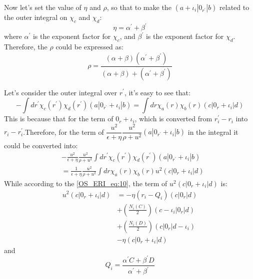 Now let's set the value of $\eta$ and $\rho$, so that to make the $(a+\iota_{i}|0_{r^{'}}|b)$
related to the outer integral on $\chi_{c}$ and $\chi_{d}$:
\begin{equation}
 \label{OS_ERI_eq:16}
\eta = \alpha^{'} + \beta^{'} 
\end{equation}
where $\alpha^{'}$ is the exponent factor for $\chi_{c}$, and $\beta^{'}$ is the exponent
factor for $\chi_{d}$. Therefore, the $\rho$ could be expressed as:
\begin{equation}
 \label{OS_ERI_eq:17}
\rho = \frac{(\alpha+\beta)(\alpha^{'} + \beta^{'})}{(\alpha+\beta)+(\alpha^{'} + \beta^{'})} 
\end{equation}

Let's consider the outer integral over $r^{'}$, it's easy to see that:
\begin{equation}
\label{OS_ERI_eq:18}
 -\int dr^{'} \chi_{c}(r^{'})\chi_{d}(r^{'})(a|0_{r^{'}} +\iota_{i} |b)
= \int dr \chi_{a}(r)\chi_{b}(r)(c|0_{r} + \iota_{i}|d)
\end{equation}
This is because that for the term of $0_{r} + \iota_{i}$, which is converted from
$r^{'}_{i} - r_{i}$ into $r_{i}-r^{'}_{i}$.Therefore, for the term of 
$\dfrac{u^{2}}{\epsilon+\eta}\dfrac{u^{2}}
{\rho+u^{2}}(a|0_{r^{'}}+\iota_{i}|b)$ in the integral it could be converted into:
\begin{equation}
 \label{OS_ERI_eq:19}
\begin{split}
&-\frac{u^{2}}{\epsilon+\eta}\frac{u^{2}}
{\rho+u^{2}}\int dr^{'} \chi_{c}(r^{'})\chi_{d}(r^{'})(a|0_{r^{'}}+\iota_{i}|b) \\
&=\frac{1}{\epsilon+\eta}\frac{u^{2}}
{\rho+u^{2}}\int dr \chi_{a}(r)\chi_{b}(r)u^{2}(c|0_{r}+\iota_{i}|d)
\end{split}
\end{equation}
While according to the \ref{OS_ERI_eq:10}, the term of $u^{2}(c|0_{r}+\iota_{i}|d)$
is:
\begin{equation}
 \begin{split}
  u^{2}(c|0_{r}+\iota_{i}|d) &= 
-\eta(r_{i} - Q_{i})(c|0_{r}|d) \\
&+
\left(\frac{N_{i}(C)}{2}\right)(c-\iota_{i}|0_{r}|d) \\
&+
\left(\frac{N_{i}(D)}{2}\right)(c|0_{r}|d-\iota_{i}) \\
&-\eta(c|0_{r}+\iota_{i}|d)
 \end{split}
\label{OS_ERI_eq:20}
\end{equation}
and 
\begin{equation}
 Q_{i} = \frac{\alpha^{'}C + \beta^{'}D}{\alpha^{'} + \beta^{'}}
\end{equation}


